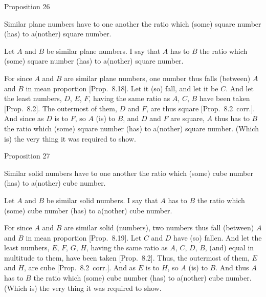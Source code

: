 
\begin{center}
{\large Proposition 26}
\end{center}

Similar plane numbers have to one another
the ratio which (some) square number (has) to a(nother) square number.

\epsfysize=0.8in
\centerline{}

Let $A$ and $B$ be similar plane numbers. I say that $A$ has to $B$ the
ratio which (some) square number (has) to a(nother) square number.

For since $A$ and $B$ are similar plane numbers, one number thus
falls  (between) $A$ and $B$ in mean proportion [Prop.~8.18]. Let it (so) fall, and let it be $C$. 
And let the least numbers, $D$, $E$, $F$, having the same
ratio as $A$, $C$, $B$ have been taken [Prop.~8.2].
The outermost of them, $D$ and $F$, are thus square 
[Prop.~8.2~corr.]. And since as $D$ is to $F$, so
$A$ (is) to $B$, and $D$ and $F$ are square, $A$ thus
has to $B$ the ratio which (some) square number (has) to a(nother)
square number. (Which is) the very thing it was required to show.


\begin{center}
{\large Proposition 27}
\end{center}

Similar solid numbers have to one another the
ratio which (some) cube number (has) to a(nother) cube number.

\epsfysize=1in
\centerline{}

Let $A$ and $B$ be similar solid  numbers. I say that $A$ has to $B$
the ratio which (some) cube number (has) to a(nother) cube number.

For since $A$ and $B$ are similar solid (numbers), two numbers thus
fall
  (between) $A$ and $B$ in mean proportion [Prop.~8.19]. Let $C$ and $D$ have (so) fallen.
And let the least numbers, $E$, $F$, $G$, $H$, having the same
ratio as $A$, $C$, $D$, $B$, (and) equal in multitude to them, have been taken [Prop.~8.2]. Thus, the outermost of them,
$E$ and $H$, are cube  [Prop.~8.2~corr.].
And as $E$ is to $H$, so $A$ (is) to $B$. And thus $A$ has to $B$ the ratio
which (some) cube number (has) to a(nother) cube number. (Which
is) the very thing it was required to show.
\newpage~\\
\thispagestyle{plain}